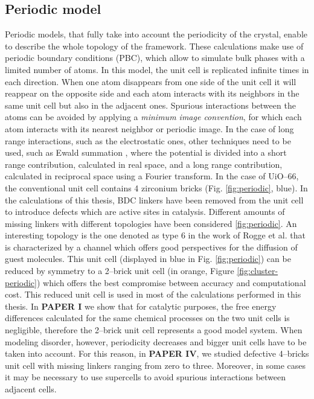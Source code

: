 \subsection*{Periodic model}
Periodic models, that fully take into account the periodicity of the crystal, enable to describe the whole topology of the framework. These calculations make use of periodic boundary conditions (PBC), which allow to simulate bulk phases with a limited number of atoms. In this model, the unit cell is replicated infinite times in each direction. When one atom disappears from one side of the unit cell it will reappear on the opposite side and each atom interacts with its neighbors in the same unit cell but also in the adjacent ones. Spurious interactions between the atoms can be avoided by applying a \textit{minimum image convention}, for which each atom interacts with its nearest neighbor or periodic image. In the case of long range interactions, such as the electrostatic ones, other techniques need to be used, such as Ewald summation \cite{Ewald1921}, where the potential is divided into a short range contribution, calculated in real space, and a long range contribution, calculated in reciprocal space using a Fourier transform. 
\npar
In the case of UiO--66, the conventional unit cell\cite{cavka2008new} contains 4 zirconium bricks (Fig. \ref{fig:periodic}, blue). In the calculations of this thesis, BDC linkers have been removed from the unit cell to introduce defects which are active sites in catalysis. Different amounts of missing linkers with different topologies have been considered \ref{fig:periodic}. An interesting topology is the one denoted as type 6 in the work of Rogge et al.\cite{rogge2017metal} that is characterized by a channel which offers good perspectives for the diffusion of guest molecules. This unit cell (displayed in blue in Fig. \ref{fig:periodic}) can be reduced by symmetry to a 2--brick unit cell (in orange, Figure \ref{fig:cluster-periodic}) which offers the best compromise between accuracy and computational cost. This reduced unit cell is used in most of the calculations performed in this thesis. In \textbf{PAPER I} we show that for catalytic purposes, the free energy differences calculated for the same chemical processes on the two unit cells is negligible, therefore the 2--brick unit cell represents a good model system. When modeling disorder, however, periodicity decreases and bigger unit cells have to be taken into account. For this reason, in \textbf{PAPER IV}, we studied defective 4--bricks unit cell with missing linkers ranging from zero to three. Moreover, in some cases it may be necessary to use supercells to avoid spurious interactions between adjacent cells.

